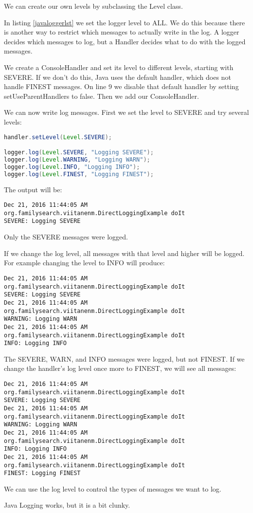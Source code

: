 We can create our own levels by subclassing the Level class\cite{level}.

In listing \ref{javaloggerlst} we set the logger level to ALL. We do this because there is another way to restrict which messages to actually write in the log. A logger decides which messages to log, but a Handler decides what to do with the logged messages. 

We create a ConsoleHandler and set its level to different levels, starting with SEVERE. If we don't do this, Java uses the default handler, which does not handle FINEST messages. On line 9 we disable that default handler by setting setUseParentHandlers to false. Then we add our ConsoleHandler.

We can now write log messages. First we set the level to SEVERE and try several levels:

\begin{lstlisting}[language=Java]
handler.setLevel(Level.SEVERE);

logger.log(Level.SEVERE, "Logging SEVERE");
logger.log(Level.WARNING, "Logging WARN");
logger.log(Level.INFO, "Logging INFO");
logger.log(Level.FINEST, "Logging FINEST");
\end{lstlisting}

The output will be:
\begin{lstlisting}
Dec 21, 2016 11:44:05 AM org.familysearch.viitanenm.DirectLoggingExample doIt
SEVERE: Logging SEVERE
\end{lstlisting}

Only the SEVERE  messages were logged.

If we change the log level, all messages with that level and higher will be logged. For example changing the level to INFO will produce:

\begin{lstlisting}
Dec 21, 2016 11:44:05 AM org.familysearch.viitanenm.DirectLoggingExample doIt
SEVERE: Logging SEVERE
Dec 21, 2016 11:44:05 AM org.familysearch.viitanenm.DirectLoggingExample doIt
WARNING: Logging WARN
Dec 21, 2016 11:44:05 AM org.familysearch.viitanenm.DirectLoggingExample doIt
INFO: Logging INFO
\end{lstlisting}

The SEVERE, WARN, and INFO messages were logged, but not FINEST. If we change the handler's log level once more to FINEST, we will see all messages:

\begin{lstlisting}
Dec 21, 2016 11:44:05 AM org.familysearch.viitanenm.DirectLoggingExample doIt
SEVERE: Logging SEVERE
Dec 21, 2016 11:44:05 AM org.familysearch.viitanenm.DirectLoggingExample doIt
WARNING: Logging WARN
Dec 21, 2016 11:44:05 AM org.familysearch.viitanenm.DirectLoggingExample doIt
INFO: Logging INFO
Dec 21, 2016 11:44:05 AM org.familysearch.viitanenm.DirectLoggingExample doIt
FINEST: Logging FINEST

\end{lstlisting}

We can use the log level to control the types of messages we want to log.

Java Logging works, but it is a bit clunky.